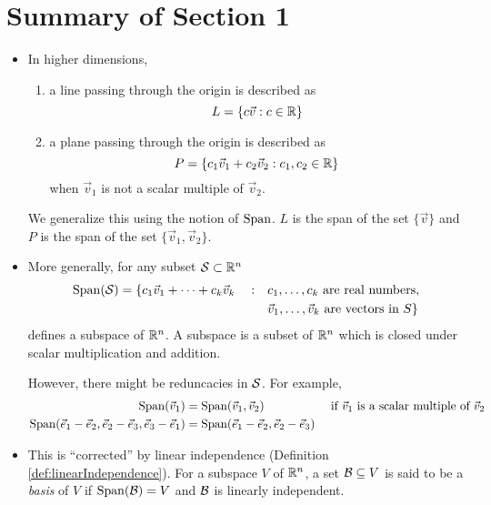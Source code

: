 \section*{Summary of Section 1}
\begin{itemize}
  \item In higher dimensions,
      \begin{enumerate}
        \item a line passing through the origin is described as
        \begin{equation*}
          L = \{ c \vec{v} : c \in \mathbb{R} \}
        \end{equation*}
        \item a plane passing through the origin is described as
        \begin{equation*}
          P = \{ c_1 \vec{v}_1 + c_2 \vec{v}_2 : c_1, c_2 \in \mathbb{R} \}
        \end{equation*}
        when $\vec{v}_1$ is not a scalar multiple of $\vec{v}_2$.
      \end{enumerate}
    We generalize this using the notion of $\operatorname{Span}$. $L$ is the span of the set $\{\vec{v}\}$ and $P$ is the span of the set $\{ \vec{v}_1, \vec{v}_2 \}$.

    \item More generally, for any subset $\mathcal{S} \subset \mathbb{R}^n$
    \begin{align*}
      \operatorname{Span}(\mathcal{S}) = \{ c_1 \vec{v}_1 + \dots + c_k \vec{v}_k \quad : \quad
      & c_1, \dots, c_k \mbox{ are real numbers}, \\
      & \vec{v}_1, \dots, \vec{v}_k \mbox{ are vectors in } S \}
    \end{align*}
    defines a subspace of $\mathbb{R}^n$. A subspace is a subset of $\mathbb{R}^n$ which is closed under scalar multiplication and addition.

    However, there might be reduncacies in $\mathcal{S}$. For example,
    \begin{align*}
      \operatorname{Span}(\vec{v}_1) &= \operatorname{Span}(\vec{v}_1, \vec{v}_2)
      && \mbox{ if $\vec{v}_1$ is a scalar multiple of $\vec{v}_2$} \\
      \operatorname{Span}(\vec{e}_1 - \vec{e}_2, \vec{e}_2 - \vec{e}_3, \vec{e}_3 - \vec{e}_1) &= \operatorname{Span}(\vec{e}_1 - \vec{e}_2, \vec{e}_2 - \vec{e}_3)
    \end{align*}

    \item This is ``corrected'' by linear independence (Definition \ref{def:linearIndependence}). For a subspace $V$ of $\mathbb{R}^n$, a set $\mathcal{B} \subseteq V$ is said to be a \emph{basis} of $V$ if $\operatorname{Span}(\mathcal{B}) = V$ and ${\mathcal{B}}$ is linearly independent.


\end{itemize}
